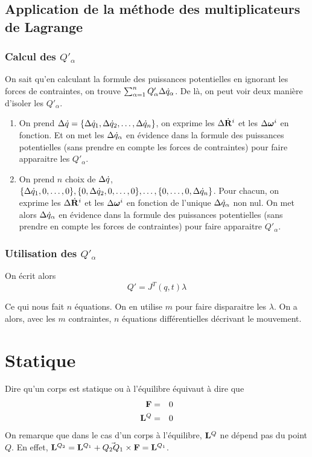 \subsection{Application de la méthode des multiplicateurs de Lagrange}

\subsubsection{Calcul des $Q'_\alpha$}
On sait qu'en calculant la formule des puissances potentielles en ignorant les forces de contraintes,
on trouve $\sum_{\alpha = 1}^n Q'_\alpha \Delta \dot{q}_\alpha$.
De là, on peut voir deux manière d'isoler les $Q'_\alpha$.
\begin{enumerate}
  \item On prend $\Delta \dot{q} = \{\Delta \dot{q}_1, \Delta \dot{q}_2, \ldots, \Delta \dot{q}_n\}$, on exprime les $\Delta \dot{\bf R}^i$ et les $\Delta {\bm \omega}^i$ en fonction.
    Et on met les $\Delta \dot{q}_\alpha$ en évidence dans la formule des puissances potentielles (sans prendre en compte les forces de contraintes) pour faire apparaitre les $Q'_\alpha$.
  \item On prend $n$ choix de $\Delta \dot{q}$, $\{\Delta \dot{q}_1, 0, \ldots, 0\}, \{0, \Delta \dot{q}_2, 0, \ldots, 0\}, \ldots, \{0, \ldots, 0, \Delta \dot{q}_n\}$.
    Pour chacun, on exprime les $\Delta \dot{\bf R}^i$ et les $\Delta {\bm \omega}^i$ en fonction de l'unique $\Delta \dot{q}_\alpha$ non nul.
    On met alors $\Delta \dot{q}_\alpha$ en évidence dans la formule des puissances potentielles (sans prendre en compte les forces de contraintes) pour faire apparaitre $Q'_\alpha$.
\end{enumerate}

\subsubsection{Utilisation des $Q'_\alpha$}
On écrit alors
\[ Q' = J^T(q, t) \lambda \]

Ce qui nous fait $n$ équations.
On en utilise $m$ pour faire disparaitre les $\lambda$.
On a alors, avec les $m$ contraintes, $n$ équations différentielles décrivant le mouvement.

\section{Statique}

Dire qu'un corps est statique ou à l'équilibre équivaut à dire que
\begin{eqnarray*}
  {\bf F} &=& 0\\
  {\bf L}^Q &=& 0
\end{eqnarray*}
On remarque que dans le cas d'un corps à l'équilibre, ${\bf L}^Q$ ne dépend pas du point $Q$.
En effet, ${\bf L}^{Q_2} = {\bf L}^{Q_1} + \vec{Q_2Q_1} \times {\bf F} = {\bf L}^{Q_1}$.

